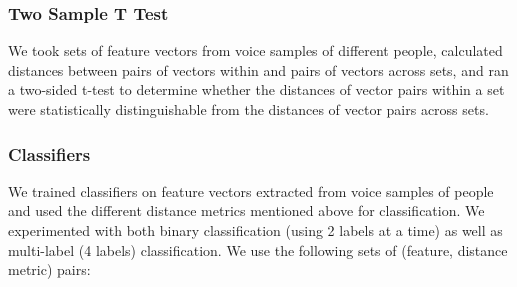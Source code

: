 \documentclass[12pt]{article}
\begin{document}
\subsubsection{Two Sample T Test}
\-\hspace{1cm} We took sets of feature vectors from voice samples of different
people, calculated distances between pairs of vectors within and pairs of
vectors across sets, and ran a two-sided t-test to determine whether the
distances of vector pairs within a set were statistically distinguishable from
the distances of vector pairs across sets.
\subsubsection{Classifiers}
\-\hspace{1cm} We trained classifiers on feature vectors extracted from voice
samples of people and used the different distance metrics mentioned above for
classification. We experimented with both binary classification (using 2 labels
at a time) as well as multi-label (4 labels) classification. We use the
following sets of (feature, distance metric) pairs:
\end{document}
